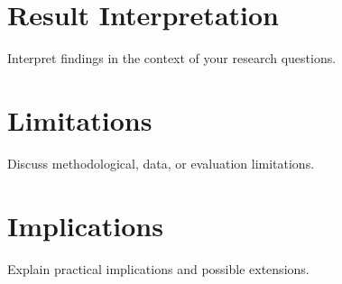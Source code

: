 \section{Result Interpretation}

Interpret findings in the context of your research questions.

\section{Limitations}

Discuss methodological, data, or evaluation limitations.

\section{Implications}

Explain practical implications and possible extensions.
